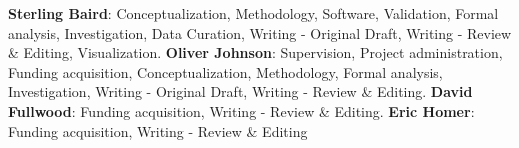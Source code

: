 \textbf{Sterling Baird}: Conceptualization, Methodology, Software, Validation, Formal analysis, Investigation, Data Curation, Writing - Original Draft, Writing - Review \& Editing, Visualization. \textbf{Oliver Johnson}: Supervision, Project administration, Funding acquisition, Conceptualization, Methodology, Formal analysis, Investigation, Writing - Original Draft, Writing - Review \& Editing. \textbf{David Fullwood}: Funding acquisition, Writing - Review \& Editing. \textbf{Eric Homer}: Funding acquisition, Writing - Review \& Editing
